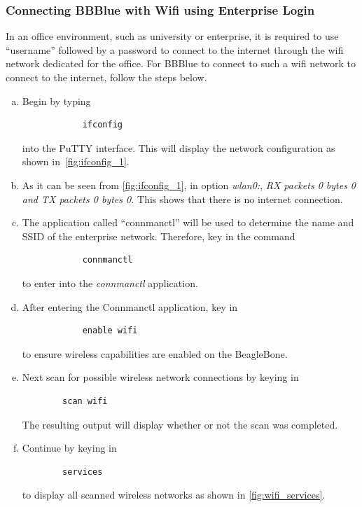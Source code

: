 \subsubsection{Connecting BBBlue with Wifi using Enterprise Login}

In an office environment, such as university or enterprise, it is required to
use ``username'' followed by a password to connect to the internet through the
wifi network dedicated for the office. For BBBlue to connect to such a wifi
network to connect to the internet, follow the steps below.


\begin{enumerate}[a)]
    \item Begin by typing 
         \begin{verbatim}
            ifconfig
         \end{verbatim}
         into the PuTTY interface. This will display the network configuration as shown in~\autoref{fig:ifconfig_1}.

\item As it can be seen from \autoref{fig:ifconfig_1}, in option \emph{wlan0:},
  \emph{RX packets 0 bytes 0 and TX packets 0 bytes 0.} This shows that there is
  no internet connection.

  
\item The application called ``connmanctl'' will be used to determine the name and SSID of the enterprise network. Therefore, key in the command
        \begin{verbatim}
            connmanctl
        \end{verbatim}
    to enter into the \emph{connmanctl} application.
    
    \item After entering the Connmanctl application, key in
        \begin{verbatim}
            enable wifi
        \end{verbatim}
    to ensure wireless capabilities are enabled on the BeagleBone.
    
    \item Next scan for possible wireless network connections by keying in
    \begin{verbatim}
        scan wifi
    \end{verbatim}
    The resulting output will display whether or not the scan was completed.
    \item Continue by keying in
    \begin{verbatim}
        services
    \end{verbatim}
    to display all scanned wireless networks as shown in \autoref{fig:wifi_services}.


\end{enumerate}
